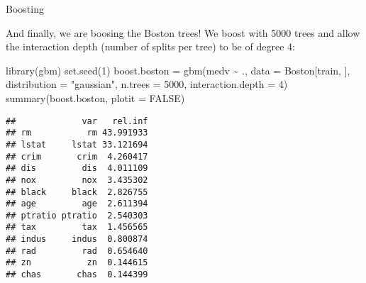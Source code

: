 \documentclass[
  10pt,
  ignorenonframetext,
]{beamer}
\newenvironment{Shaded}{\begin{snugshade}}{\end{snugshade}}
\newcommand{\AttributeTok}[1]{\textcolor[rgb]{0.77,0.63,0.00}{#1}}
\newcommand{\ConstantTok}[1]{\textcolor[rgb]{0.00,0.00,0.00}{#1}}
\newcommand{\DecValTok}[1]{\textcolor[rgb]{0.00,0.00,0.81}{#1}}
\newcommand{\FunctionTok}[1]{\textcolor[rgb]{0.00,0.00,0.00}{#1}}
\newcommand{\NormalTok}[1]{#1}
\newcommand{\OtherTok}[1]{\textcolor[rgb]{0.56,0.35,0.01}{#1}}
\newcommand{\SpecialCharTok}[1]{\textcolor[rgb]{0.00,0.00,0.00}{#1}}
\newcommand{\StringTok}[1]{\textcolor[rgb]{0.31,0.60,0.02}{#1}}
\begin{document}
\begin{frame}[fragile]
\begin{block}{Boosting}
\protect\hypertarget{boosting-1}{}
\vspace{2mm}

And finally, we are boosing the Boston trees! We boost with 5000 trees
and allow the interaction depth (number of splits per tree) to be of
degree 4:

\vspace{2mm}

\scriptsize

\begin{Shaded}
\begin{Highlighting}[]
\FunctionTok{library}\NormalTok{(gbm)}
\FunctionTok{set.seed}\NormalTok{(}\DecValTok{1}\NormalTok{)}
\NormalTok{boost.boston }\OtherTok{=} \FunctionTok{gbm}\NormalTok{(medv }\SpecialCharTok{\textasciitilde{}}\NormalTok{ ., }\AttributeTok{data =}\NormalTok{ Boston[train, ], }\AttributeTok{distribution =} \StringTok{"gaussian"}\NormalTok{,}
    \AttributeTok{n.trees =} \DecValTok{5000}\NormalTok{, }\AttributeTok{interaction.depth =} \DecValTok{4}\NormalTok{)}
\FunctionTok{summary}\NormalTok{(boost.boston, }\AttributeTok{plotit =} \ConstantTok{FALSE}\NormalTok{)}
\end{Highlighting}
\end{Shaded}

\begin{verbatim}
##             var   rel.inf
## rm           rm 43.991933
## lstat     lstat 33.121694
## crim       crim  4.260417
## dis         dis  4.011109
## nox         nox  3.435302
## black     black  2.826755
## age         age  2.611394
## ptratio ptratio  2.540303
## tax         tax  1.456565
## indus     indus  0.800874
## rad         rad  0.654640
## zn           zn  0.144615
## chas       chas  0.144399
\end{verbatim}
\end{block}
\end{frame}
\end{document}
